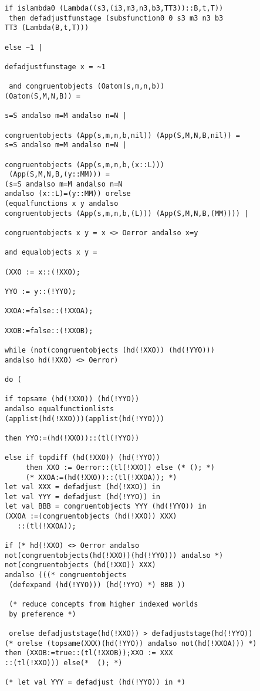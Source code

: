 \documentclass[12pt]{article}
\begin{document}
\begin{verbatim}
if islambda0 (Lambda((s3,(i3,m3,n3,b3,TT3))::B,t,T))
 then defadjustfunstage (subsfunction0 0 s3 m3 n3 b3 
TT3 (Lambda(B,t,T)))

else ~1 |

defadjustfunstage x = ~1

 and congruentobjects (Oatom(s,m,n,b)) 
(Oatom(S,M,N,B)) =

s=S andalso m=M andalso n=N |

congruentobjects (App(s,m,n,b,nil)) (App(S,M,N,B,nil)) =
s=S andalso m=M andalso n=N |

congruentobjects (App(s,m,n,b,(x::L)))
 (App(S,M,N,B,(y::MM))) =
(s=S andalso m=M andalso n=N 
andalso (x::L)=(y::MM)) orelse
(equalfunctions x y andalso 
congruentobjects (App(s,m,n,b,(L))) (App(S,M,N,B,(MM)))) |

congruentobjects x y = x <> Oerror andalso x=y

and equalobjects x y =

(XXO := x::(!XXO);

YYO := y::(!YYO);

XXOA:=false::(!XXOA);

XXOB:=false::(!XXOB);

while (not(congruentobjects (hd(!XXO)) (hd(!YYO))) 
andalso hd(!XXO) <> Oerror)

do (

if topsame (hd(!XXO)) (hd(!YYO)) 
andalso equalfunctionlists 
(applist(hd(!XXO)))(applist(hd(!YYO)))

then YYO:=(hd(!XXO))::(tl(!YYO))

else if topdiff (hd(!XXO)) (hd(!YYO)) 
     then XXO := Oerror::(tl(!XXO)) else (* (); *)
	 (* XXOA:=(hd(!XXO))::(tl(!XXOA)); *)
let val XXX = defadjust (hd(!XXO)) in
let val YYY = defadjust (hd(!YYO)) in
let val BBB = congruentobjects YYY (hd(!YYO)) in
(XXOA :=(congruentobjects (hd(!XXO)) XXX)
   ::(tl(!XXOA));

if (* hd(!XXO) <> Oerror andalso 
not(congruentobjects(hd(!XXO))(hd(!YYO))) andalso *)
not(congruentobjects (hd(!XXO)) XXX) 
andalso (((* congruentobjects
 (defexpand (hd(!YYO))) (hd(!YYO) *) BBB ))
 
 (* reduce concepts from higher indexed worlds
 by preference *)
 
 orelse defadjuststage(hd(!XXO)) > defadjuststage(hd(!YYO))
(* orelse (topsame(XXX)(hd(!YYO)) andalso not(hd(!XXOA))) *)
then (XXOB:=true::(tl(!XXOB));XXO := XXX
::(tl(!XXO))) else(*  (); *)

(* let val YYY = defadjust (hd(!YYO)) in *)


\end{verbatim}
\end{document}
